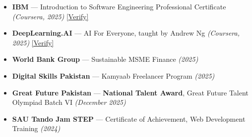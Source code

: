 \documentclass[10pt, a4paper]{article}
\begin{document}
\begin{itemize}
  \item \textbf{IBM} — Introduction to Software Engineering Professional Certificate \textit{(Coursera, 2025)}
    \href{https://coursera.org/verify/E42GWWF22X5S}{\small\textcolor{muted}{[Verify]}}
  \item \textbf{DeepLearning.AI} — AI For Everyone, taught by Andrew Ng \textit{(Coursera, 2025)}
    \href{https://www.coursera.org/account/accomplishments/verify/BTJWB77W6W2Q}{\small\textcolor{muted}{[Verify]}}
  \item \textbf{World Bank Group} — Sustainable MSME Finance \textit{(2025)}
  \item \textbf{Digital Skills Pakistan} — Kamyaab Freelancer Program \textit{(2025)}
  \item \textbf{Great Future Pakistan} — \textbf{National Talent Award}, Great Future Talent Olympiad Batch VI \textit{(December 2025)}
  \item \textbf{SAU Tando Jam STEP} — Certificate of Achievement, Web Development Training \textit{(2024)}
\end{itemize}
\end{document}
